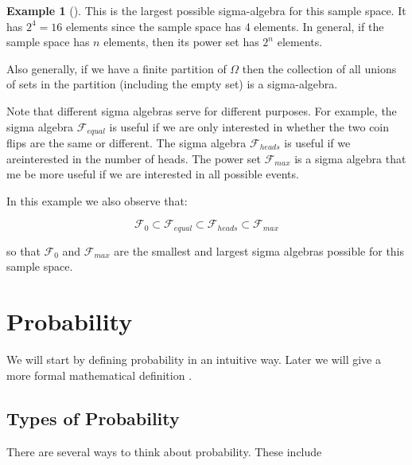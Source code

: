 \documentclass[
  letterpaper,
  DIV=11,
  numbers=noendperiod]{scrreport}
\theoremstyle{definition}
\newtheorem{example}{Example}[chapter]
\theoremstyle{plain}
\theoremstyle{definition}
\theoremstyle{plain}
\theoremstyle{remark}
\begin{document}
\begin{tcolorbox}
\begin{example}[]
This is the largest possible sigma-algebra for this sample space. It has
\(2^4=16\) elements since the sample space has 4 elements. In general,
if the sample space has \(n\) elements, then its power set has \(2^n\)
elements.

Also generally, if we have a finite partition of \(\Omega\) then the
collection of all unions of sets in the partition (including the empty
set) is a sigma-algebra.

Note that different sigma algebras serve for different purposes. For
example, the sigma algebra \(\mathcal F_{equal}\) is useful if we are
only interested in whether the two coin flips are the same or different.
The sigma algebra \(\mathcal F_{heads}\) is useful if we areinterested
in the number of heads. The power set \(\mathcal F_{max}\) is a sigma
algebra that me be more useful if we are interested in all possible
events.

In this example we also observe that:

\[
\mathcal F_0 \subset \mathcal F_{equal}
\subset \mathcal F_{heads}
\subset \mathcal F_{max}
\]

so that \(\mathcal F_0\) and \(\mathcal F_{max}\) are the smallest and
largest sigma algebras possible for this sample space.

\end{example}

\end{tcolorbox}

\section{Probability}\label{probability}

We will start by defining probability in an intuitive way. Later we will
give a more formal mathematical definition .

\subsection{Types of Probability}\label{types-of-probability}

There are several ways to think about probability. These include
\end{document}
